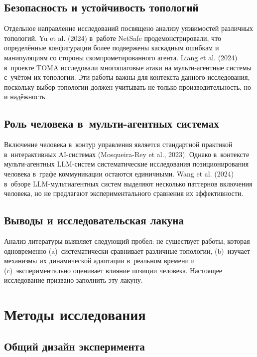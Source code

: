 \documentclass[12pt, a4paper]{article}
\begin{document}
\subsection{Безопасность и устойчивость топологий}

Отдельное направление исследований посвящено анализу уязвимостей различных топологий. Yu et al. (2024) в~работе NetSafe продемонстрировали, что определённые конфигурации более подвержены каскадным ошибкам и манипуляциям со стороны скомпрометированного агента. Liang et al. (2024) в~проекте TOMA исследовали многошаговые атаки на мульти-агентные системы с~учётом их топологии. Эти работы важны для контекста данного исследования, поскольку выбор топологии должен учитывать не только производительность, но и надёжность.

\subsection{Роль человека в~мульти-агентных системах}

Включение человека в~контур управления является стандартной практикой в~интерактивных AI-системах (Mosqueira-Rey et al., 2023). Однако в~контексте мульти-агентных LLM-систем систематические исследования позиционирования человека в~графе коммуникации остаются единичными. Wang et al. (2024) в~обзоре LLM-мультиагентных систем выделяют несколько паттернов включения человека, но не предлагают экспериментального сравнения их эффективности.

\subsection{Выводы и исследовательская лакуна}

Анализ литературы выявляет следующий пробел: не существует работы, которая одновременно (a)~систематически сравнивает различные топологии, (b)~изучает механизмы их динамической адаптации в~реальном времени и (c)~экспериментально оценивает влияние позиции человека. Настоящее исследование призвано заполнить эту лакуну.


\section{Методы исследования}

\subsection{Общий дизайн эксперимента}
\end{document}
